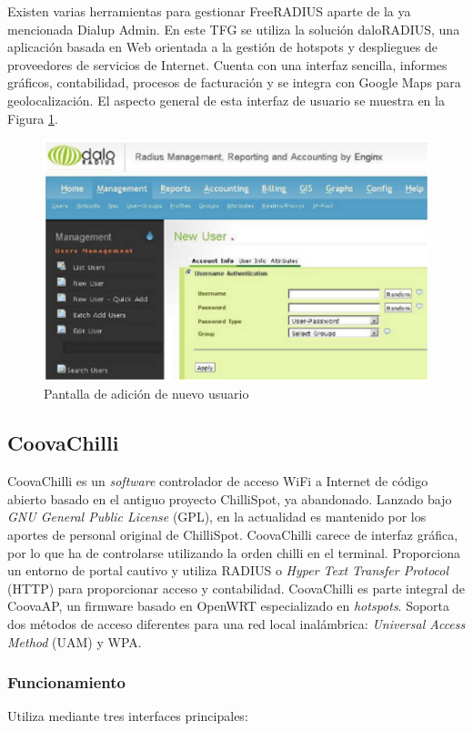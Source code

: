 Existen varias herramientas para gestionar FreeRADIUS aparte de la ya mencionada Dialup Admin. En este TFG se utiliza la solución daloRADIUS, una aplicación basada en Web orientada a la gestión de hotspots y despliegues de proveedores de servicios de Internet. Cuenta con una interfaz sencilla, informes gráficos, contabilidad, procesos de facturación y se integra con Google Maps para geolocalización. El aspecto general de esta interfaz de usuario se muestra en la Figura \ref{daloRADIUS1}.

\begin{figure}[!t]
\begin{center}
\includegraphics[width=0.75\linewidth]{./3_Tecnologias/Img/daloRADIUS1.png}
\end{center}
\caption{Pantalla de adición de nuevo usuario}
\label{daloRADIUS1}
\end{figure}

\subsection{CoovaChilli}
CoovaChilli es un \emph{software} controlador de acceso WiFi a Internet de código abierto basado en el antiguo proyecto ChilliSpot, ya abandonado. Lanzado bajo \emph{GNU General Public License} (GPL), en la actualidad es mantenido por los aportes de personal original de ChilliSpot. CoovaChilli carece de interfaz gráfica, por lo que ha de controlarse utilizando la orden chilli en el terminal. Proporciona un entorno de portal cautivo y utiliza RADIUS o \emph{Hyper Text Transfer Protocol} (\acrshort{HTTP}) para proporcionar acceso y contabilidad. CoovaChilli es parte integral de CoovaAP, un firmware basado en OpenWRT especializado en \emph{hotspots}. Soporta dos métodos de acceso diferentes para una red local inalámbrica: \emph{Universal Access Method} (\acrshort{UAM}) y WPA.

\subsubsection{Funcionamiento}
Utiliza mediante tres interfaces principales:

